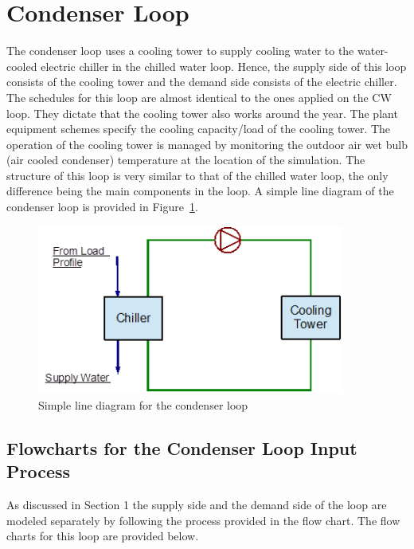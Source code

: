 \section{Condenser Loop}\label{condenser-loop}

The condenser loop uses a cooling tower to supply cooling water to the water-cooled electric chiller in the chilled water loop. Hence, the supply side of this loop consists of the cooling tower and the demand side consists of the electric chiller. The schedules for this loop are almost identical to the ones applied on the CW loop. They dictate that the cooling tower also works around the year. The plant equipment schemes specify the cooling capacity/load of the cooling tower. The operation of the cooling tower is managed by monitoring the outdoor air wet bulb (air cooled condenser) temperature at the location of the simulation. The structure of this loop is very similar to that of the chilled water loop, the only difference being the main components in the loop. A simple line diagram of the condenser loop is provided in Figure~\ref{fig:simple-line-diagram-for-the-condenser-loop-002}.

\begin{figure}[hbtp] %
\centering
\includegraphics[width=0.9\textwidth, height=0.9\textheight, keepaspectratio=true]{media/image028.png}
\caption{Simple line diagram for the condenser loop \protect \label{fig:simple-line-diagram-for-the-condenser-loop-002}}
\end{figure}

\subsection{Flowcharts for the Condenser Loop Input Process}\label{flowcharts-for-the-condenser-loop-input-process-001}

As discussed in Section 1 the supply side and the demand side of the loop are modeled separately by following the process provided in the flow chart. The flow charts for this loop are provided below.

